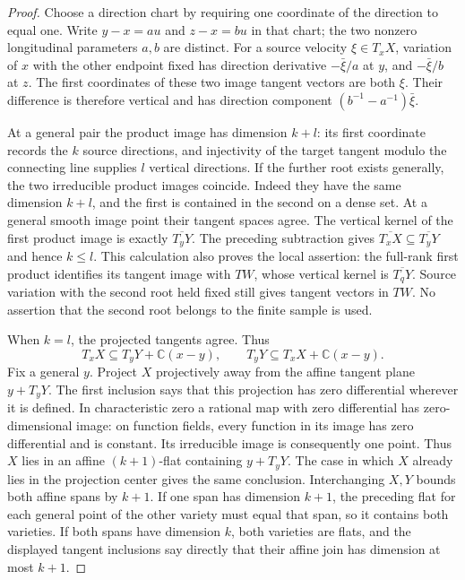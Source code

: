 \begin{proof}
Choose a direction chart by requiring one coordinate of the direction
to equal one. Write $y-x=a u$ and $z-x=b u$ in that chart; the two
nonzero longitudinal parameters $a,b$ are distinct.
For a source velocity $\xi\in T_xX$, variation of $x$ with the other
endpoint fixed has direction derivative $-\bar\xi/a$ at $y$, and
$-\bar\xi/b$ at $z$. The first coordinates of these two image tangent
vectors are both $\xi$. Their difference is therefore vertical and
has direction component $(b^{-1}-a^{-1})\bar\xi$.

At a general pair the product image has dimension $k+l$: its first
coordinate records the $k$ source directions, and injectivity of the
target tangent modulo the connecting line supplies $l$ vertical
directions. If the further root exists generally, the two irreducible
product images coincide. Indeed they have the same dimension $k+l$,
and the first is contained in the second on a dense set. At a general
smooth image point their tangent spaces agree. The vertical kernel of
the first product image is exactly $\overline{T_yY}$.
The preceding subtraction gives
$\overline{T_xX}\subseteq\overline{T_yY}$ and hence $k\le l$.
This calculation also proves the local assertion: the full-rank first
product identifies its tangent image with $T W$, whose vertical kernel
is $\overline{T_qY}$. Source variation with the second root held fixed
still gives tangent vectors in $T W$. No assertion that the second
root belongs to the finite sample is used.

When $k=l$, the projected tangents agree. Thus
\[
 T_xX\subseteq T_yY+\mathbb C(x-y),
 \qquad
 T_yY\subseteq T_xX+\mathbb C(x-y).
\]
Fix a general $y$. Project $X$ projectively away from the affine tangent
plane $y+T_yY$. The first inclusion says that this projection has zero
differential wherever it is defined. In characteristic zero a rational
map with zero differential has zero-dimensional image: on function
fields, every function in its image has zero differential and is
constant. Its irreducible image is consequently one point.
Thus $X$ lies in an affine $(k+1)$-flat containing $y+T_yY$.
The case in which $X$ already lies in the projection center gives the
same conclusion. Interchanging $X,Y$ bounds both affine spans by
$k+1$. If one span has dimension $k+1$, the preceding flat for each
general point of the other variety must equal that span, so it contains
both varieties. If both spans have dimension $k$, both varieties are
flats, and the displayed tangent inclusions say directly that their
affine join has dimension at most $k+1$.
\end{proof}

